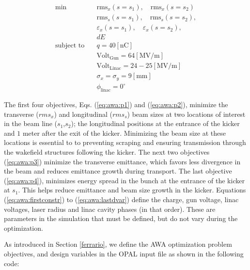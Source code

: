 \begin{align}
\text{min}  \quad & \text{rms}_{x}\left(s = s_1\right), \quad \text{rms}_{x}\left(s = s_2\right) \label{eq:awa:p1}\\
& \text{rms}_{s}\left(s = s_1\right), \quad \text{rms}_{s}\left(s = s_2\right), \label{eq:awa:p2}\\
& \varepsilon_{x}\left(s = s_1\right), \quad \varepsilon_{x}\left(s = s_2\right), \label{eq:awa:p3} \\
& dE \label{eq:awa:p4} \\
\text{subject to} \quad & q = 40 \left[\text{nC}\right] \label{eq:awa:firstconstr}\\
\quad & \text{Volt}_{\text{Gun}} = 64\left[\text{MV/m}\right] \label{eq:awa:lastconstr}\\
\quad & \text{Volt}_{\text{Linac}} = 24-25\left[\text{MV/m}\right] \\
\quad & \sigma_x = \sigma_y = 9 \left[\text{mm}\right] \label{eq:awa:firstdvar}\\
\quad & \phi_{\text{linac}} =0^\circ \label{eq:awa:lastdvar}
\end{align}

The first four objectives, Eqs. (\ref{eq:awa:p1}) and (\ref{eq:awa:p2}),
minimize the transverse ($rms_x$) and longitudinal ($rms_s$) 
beam sizes at two locations of interest in the beam line ($s_1$,$s_2$);
the longitudinal positions at the entrance of the kicker and 
$1$ meter after the exit of the kicker. 
Minimizing the beam size at these locations is essential to 
to preventing scraping and ensuring transmission through the wakefield structures 
following the kicker. The next two objectives (\ref{eq:awa:p3}) minimize the 
transverse emittance, which favors less divergence in the beam and reduces 
emittance growth during transport. The last objective (\ref{eq:awa:p4}), 
minimizes energy spread in the bunch at the entrance of the kicker at $s_1$.  
This helps reduce emittance and beam size growth in the kicker.  
Equations (\ref{eq:awa:firstconstr}) to
(\ref{eq:awa:lastdvar}) define the charge, gun voltage, linac voltages, 
laser radius and linac cavity phases (in that order). These are parameters in the simulation 
that must be defined, but do not vary during the optimization.

As introduced in Section \ref{ferrario}, we define the AWA optimization problem 
objectives, and design variables in the OPAL input file as shown in
the following code: %

